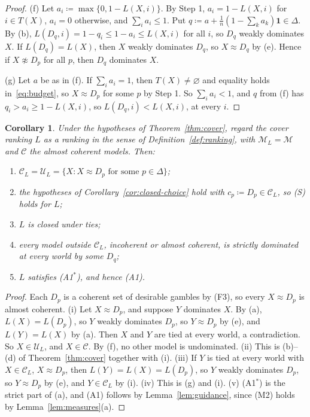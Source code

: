 \documentclass[11pt]{article}
\newtheorem{corollary}[theorem]{Corollary}
\theoremstyle{definition}
\newcommand{\one}{\mathbf 1}
\newcommand{\Cc}{\mathcal C}
\newcommand{\Mc}{\mathcal M}
\newcommand{\Uc}{\mathcal U}
\begin{document}
\begin{proof}
(f) Let $a_i\coloneqq\max\{0,1-L(X,i)\}$. By Step 1, $a_i=1-L(X,i)$ for $i\in T(X)$, $a_i=0$ otherwise, and $\sum_ia_i\le1$. Put $q\coloneqq a+\frac1n(1-\sum_ka_k)\one\in\Delta$. By (b), $L(D_q,i)=1-q_i\le1-a_i\le L(X,i)$ for all $i$, so $D_q$ weakly dominates $X$. If $L(D_q)=L(X)$, then $X$ weakly dominates $D_q$, so $X\approx D_q$ by (e). Hence if $X\not\approx D_p$ for all $p$, then $D_q$ dominates $X$.

(g) Let $a$ be as in (f). If $\sum_ia_i=1$, then $T(X)\ne\varnothing$ and equality holds in~\eqref{eq:budget}, so $X\approx D_p$ for some $p$ by Step 1. So $\sum_ia_i<1$, and $q$ from (f) has $q_i>a_i\ge1-L(X,i)$, so $L(D_q,i)<L(X,i)$, at every $i$.
\end{proof}

\begin{corollary}\label{cor:single}
Under the hypotheses of Theorem~\ref{thm:cover}, regard the cover ranking $L$ as a ranking in the sense of Definition~\ref{def:ranking}, with $\Mc_L=\Mc$ and $\Cc$ the almost coherent models. Then:
\begin{enumerate}[label=(\roman*)]
\item $\Cc_L=\Uc_L=\{X:X\approx D_p\text{ for some }p\in\Delta\}$;
\item the hypotheses of Corollary~\ref{cor:closed-choice} hold with $c_p\coloneqq D_p\in\Cc_L$, so (S) holds for $L$;
\item $L$ is closed under ties;
\item every model outside $\Cc_L$, incoherent or almost coherent, is strictly dominated at every world by some $D_q$;
\item $L$ satisfies (A1$^*$), and hence (A1).
\end{enumerate}
\end{corollary}

\begin{proof}
Each $D_p$ is a coherent set of desirable gambles by (F3), so every $X\approx D_p$ is almost coherent. (i) Let $X\approx D_p$, and suppose $Y$ dominates $X$. By (a), $L(X)=L(D_p)$, so $Y$ weakly dominates $D_p$, so $Y\approx D_p$ by (e), and $L(Y)=L(X)$ by (a). Then $X$ and $Y$ are tied at every world, a contradiction. So $X\in\Uc_L$, and $X\in\Cc$. By (f), no other model is undominated. (ii) This is (b)--(d) of Theorem~\ref{thm:cover} together with (i). (iii) If $Y$ is tied at every world with $X\in\Cc_L$, $X\approx D_p$, then $L(Y)=L(X)=L(D_p)$, so $Y$ weakly dominates $D_p$, so $Y\approx D_p$ by (e), and $Y\in\Cc_L$ by (i). (iv) This is (g) and (i). (v) (A1$^*$) is the strict part of (a), and (A1) follows by Lemma~\ref{lem:guidance}, since (M2) holds by Lemma~\ref{lem:measures}(a).
\end{proof}
\end{document}
